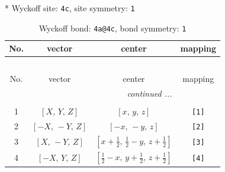 \documentclass[fleqn,8pt]{jsarticle}
\begin{document}
* Wyckoff site: {\tt 4c}, site symmetry: {\tt 1}
\renewcommand{\arraystretch}{1.2}
\begin{longtable}{cccc}
\caption{Wyckoff bond: {\tt 4a@4c}, bond symmetry: {\tt 1}}
 \\
 \hline \hline
No. & vector & center & mapping \\ \hline \endfirsthead

\multicolumn{3}{l}{\tablename\ \thetable{}} \\
 \hline \hline
No. & vector & center & mapping \\ \hline \endhead

 \hline \hline
\multicolumn{3}{r}{\footnotesize\it continued ...} \\ \endfoot

 \hline \hline
\multicolumn{3}{r}{} \\ \endlastfoot

1 & $\left[ X,\, Y,\, Z \right]$ & $\left[ x,\, y,\, z \right]$ & {\tt [1]} \\ \hline
2 & $\left[ - X,\, - Y,\, Z \right]$ & $\left[ - x,\, - y,\, z \right]$ & {\tt [2]} \\ \hline
3 & $\left[ X,\, - Y,\, Z \right]$ & $\left[ x + \frac{1}{2},\, \frac{1}{2} - y,\, z + \frac{1}{2} \right]$ & {\tt [3]} \\ \hline
4 & $\left[ - X,\, Y,\, Z \right]$ & $\left[ \frac{1}{2} - x,\, y + \frac{1}{2},\, z + \frac{1}{2} \right]$ & {\tt [4]} \\
\end{longtable}
\end{document}
